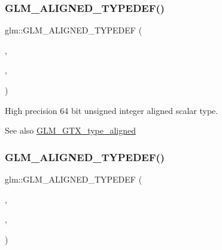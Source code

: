 \subsubsection{\texorpdfstring{G\+L\+M\+\_\+\+A\+L\+I\+G\+N\+E\+D\+\_\+\+T\+Y\+P\+E\+D\+E\+F()}{GLM\_ALIGNED\_TYPEDEF()}\hspace{0.1cm}{\footnotesize\ttfamily [100/209]}}
{\footnotesize\ttfamily glm\+::\+G\+L\+M\+\_\+\+A\+L\+I\+G\+N\+E\+D\+\_\+\+T\+Y\+P\+E\+D\+EF (\begin{DoxyParamCaption}\item[{\hyperlink{group__gtc__type__precision_ga6e66f40c5909bfc872b068187fa6029e}{highp\+\_\+uint64\+\_\+t}}]{,  }\item[{aligned\+\_\+highp\+\_\+uint64\+\_\+t}]{,  }\item[{8}]{ }\end{DoxyParamCaption})}

High precision 64 bit unsigned integer aligned scalar type. \begin{DoxySeeAlso}{See also}
\hyperlink{group__gtx__type__aligned}{G\+L\+M\+\_\+\+G\+T\+X\+\_\+type\+\_\+aligned} 
\end{DoxySeeAlso}
\mbox{\label{group__gtx__type__aligned_ga8942e09f479489441a7a5004c6d8cb66}} 
\subsubsection{\texorpdfstring{G\+L\+M\+\_\+\+A\+L\+I\+G\+N\+E\+D\+\_\+\+T\+Y\+P\+E\+D\+E\+F()}{GLM\_ALIGNED\_TYPEDEF()}\hspace{0.1cm}{\footnotesize\ttfamily [101/209]}}
{\footnotesize\ttfamily glm\+::\+G\+L\+M\+\_\+\+A\+L\+I\+G\+N\+E\+D\+\_\+\+T\+Y\+P\+E\+D\+EF (\begin{DoxyParamCaption}\item[{\hyperlink{group__gtc__type__precision_ga8a60abe782749c504fb5ae51eb8b49cc}{highp\+\_\+u8}}]{,  }\item[{aligned\+\_\+highp\+\_\+u8}]{,  }\item[{1}]{ }\end{DoxyParamCaption})}

